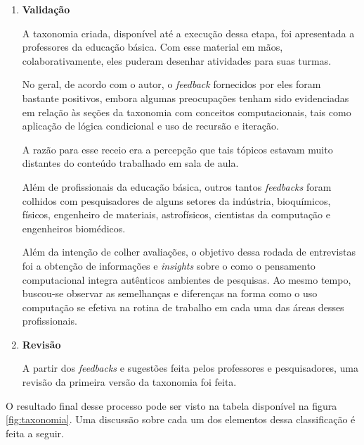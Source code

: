 \begin{enumerate}
  \item \textbf{Validação} 
  
  A taxonomia criada, disponível até a execução dessa etapa, foi apresentada a professores da educação básica. Com esse material em mãos, colaborativamente, eles puderam desenhar atividades para suas turmas. 

  No geral, de acordo com o autor, o \textit{feedback} fornecidos por eles foram bastante positivos, embora algumas preocupações tenham sido evidenciadas em relação às seções da taxonomia com conceitos computacionais, tais como aplicação de lógica condicional e uso de recursão e iteração. 
  
  A razão para esse receio era a percepção que tais tópicos estavam muito distantes do conteúdo trabalhado em sala de aula.

  Além de profissionais da educação básica, outros tantos \textit{feedbacks} foram colhidos com pesquisadores de alguns setores da indústria, bioquímicos, físicos, engenheiro de materiais, astrofísicos, cientistas da computação e engenheiros biomédicos.

  Além da intenção de colher avaliações, o objetivo dessa rodada de entrevistas foi a obtenção de informações e \textit{insights} sobre o como o pensamento computacional integra autênticos ambientes de pesquisas. Ao mesmo tempo, buscou-se observar as semelhanças e diferenças na forma como o uso computação se efetiva na rotina de trabalho em cada uma das áreas desses profissionais.

  \item \textbf{Revisão} 

  A partir dos \textit{feedbacks} e sugestões feita pelos professores e pesquisadores, uma revisão da primeira versão da taxonomia foi feita.
\end{enumerate}


O resultado final desse processo pode ser visto na tabela disponível na figura \ref{fig:taxonomia}. Uma discussão sobre cada um dos elementos dessa classificação é feita a seguir.

